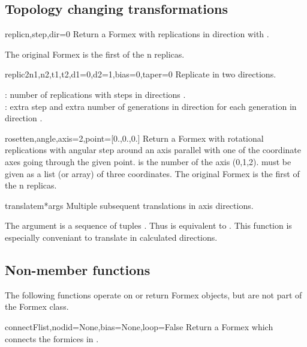 {{\subsection{Topology changing transformations}

\begin{methoddesc}{replic}{n,step,dir=0}
Return a Formex with  replications in direction  with .

The original Formex is the first of the n replicas.
\end{methoddesc}

\begin{methoddesc}{replic2}{n1,n2,t1,t2,d1=0,d2=1,bias=0,taper=0}
Replicate in two directions.

 : number of replications with steps  in directions .\\
 : extra step and extra number of generations in direction  for each generation in direction .
\end{methoddesc}

\begin{methoddesc}{rosette}{n,angle,axis=2,point=[0.,0.,0.]}
Return a Formex with  rotational replications with angular step  around an axis parallel with one of the coordinate axes going through the given point.  is the number of the axis (0,1,2).  must be given as a list (or array) of three coordinates. The original Formex is the first of the n replicas.
\end{methoddesc}

\begin{methoddesc}{translatem}{*args}
Multiple subsequent translations in axis directions.

The argument  is a sequence of tuples . Thus  is equivalent to . This function is especially conveniant to translate in calculated directions.
\end{methoddesc}



\subsection{Non-member functions}
The following functions operate on or return Formex objects, but are not part of the Formex class.

\begin{funcdesc}{connect}{Flist,nodid=None,bias=None,loop=False}
Return a Formex which connects the formices in .


\end{funcdesc}}}

